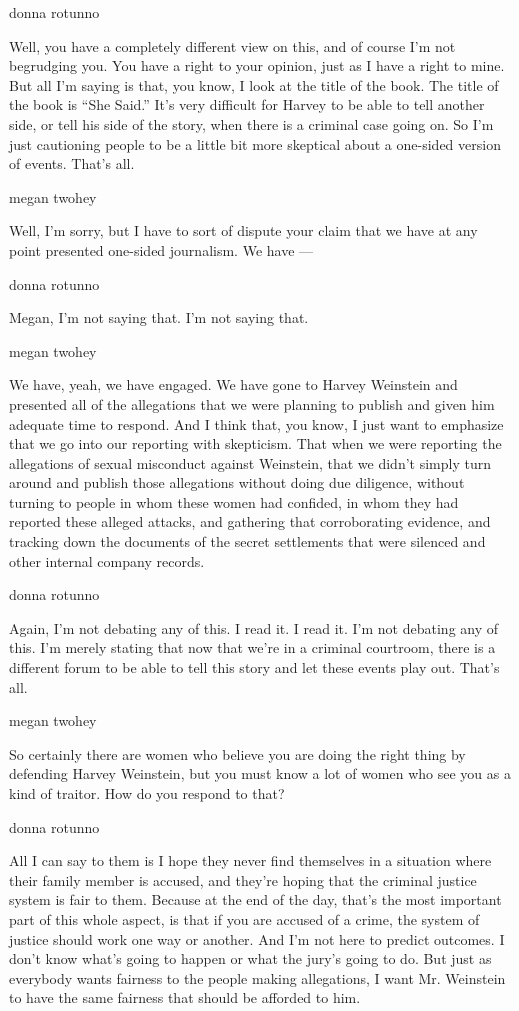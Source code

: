 donna rotunno

Well, you have a completely different view on this, and of course I'm
not begrudging you. You have a right to your opinion, just as I have a
right to mine. But all I'm saying is that, you know, I look at the title
of the book. The title of the book is ``She Said.'' It's very difficult
for Harvey to be able to tell another side, or tell his side of the
story, when there is a criminal case going on. So I'm just cautioning
people to be a little bit more skeptical about a one-sided version of
events. That's all.

megan twohey

Well, I'm sorry, but I have to sort of dispute your claim that we have
at any point presented one-sided journalism. We have ---

donna rotunno

Megan, I'm not saying that. I'm not saying that.

megan twohey

We have, yeah, we have engaged. We have gone to Harvey Weinstein and
presented all of the allegations that we were planning to publish and
given him adequate time to respond. And I think that, you know, I just
want to emphasize that we go into our reporting with skepticism. That
when we were reporting the allegations of sexual misconduct against
Weinstein, that we didn't simply turn around and publish those
allegations without doing due diligence, without turning to people in
whom these women had confided, in whom they had reported these alleged
attacks, and gathering that corroborating evidence, and tracking down
the documents of the secret settlements that were silenced and other
internal company records.

donna rotunno

Again, I'm not debating any of this. I read it. I read it. I'm not
debating any of this. I'm merely stating that now that we're in a
criminal courtroom, there is a different forum to be able to tell this
story and let these events play out. That's all.

megan twohey

So certainly there are women who believe you are doing the right thing
by defending Harvey Weinstein, but you must know a lot of women who see
you as a kind of traitor. How do you respond to that?

donna rotunno

All I can say to them is I hope they never find themselves in a
situation where their family member is accused, and they're hoping that
the criminal justice system is fair to them. Because at the end of the
day, that's the most important part of this whole aspect, is that if you
are accused of a crime, the system of justice should work one way or
another. And I'm not here to predict outcomes. I don't know what's going
to happen or what the jury's going to do. But just as everybody wants
fairness to the people making allegations, I want Mr. Weinstein to have
the same fairness that should be afforded to him.

